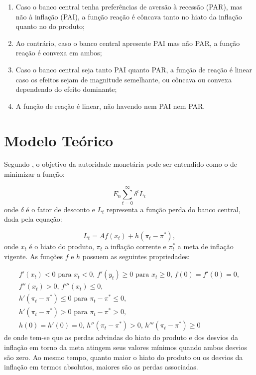 \documentclass[
	article,			%
	11pt,				%
	oneside,			%
	a4paper,			%
	english,			%
	brazil,				%
	]{abntex2}
\begin{document}
	\begin{enumerate}
		\item Caso o banco central tenha preferências de aversão à recessão (PAR), mas não à inflação (PAI), a função reação é côncava tanto no hiato da inflação quanto no do produto;
		\item Ao contrário, caso o banco central apresente PAI mas não PAR, a função reação é convexa em ambos;
		\item Caso o banco central seja tanto PAI quanto PAR, a função de reação é linear caso os efeitos sejam de magnitude semelhante, ou côncava ou convexa dependendo do efeito dominante;
		\item A função de reação é linear, não havendo nem PAI nem PAR.
	\end{enumerate}
	
	\section{Modelo Teórico}
	
	Segundo , o objetivo da autoridade monetária pode ser entendido como o de minimizar a função:
	
	\begin{equation}  \label{funcao_perda}
		E_0\sum_{t=0}^{\infty}\delta^t L_t
	\end{equation}
	onde $\delta$ é o fator de desconto e $L_{t}$ representa a função perda do banco central, dada pela equação:
	
	\begin{equation}
		L_t = Af(x_t) + h(\pi_t - \pi^*),
	\end{equation}
	onde $x_t$ é o hiato do produto, $\pi_t$ a inflação corrente e $\pi_t^*$ a meta de inflação vigente. As funções $f$ e $h$ possuem as seguintes propriedades:
	
	\begin{eqnarray}
		f'(x_t) < 0 \mbox{ para } x_t < 0 \mbox{, } f'(y_t) \geq 0 \mbox{ para } x_t \geq 0 \mbox{, } f(0) = f'(0) = 0,\nonumber \\
		f''(x_t)>0 \mbox{, } f'''(x_t) \leq 0,\nonumber \\
		h'(\pi_t-\pi^*) \leq 0 \mbox{ para } \pi_t - \pi^* \leq 0, \nonumber \\
		h'(\pi_t-\pi^*) > 0 \mbox{ para } \pi_t - \pi^* > 0, \nonumber \\
		h(0)=h'(0)=0 \mbox{, } h''(\pi_t-\pi^*)>0 \mbox{, } h'''(\pi_t-\pi^*) \geq 0
	\end{eqnarray}
	de onde tem-se que as perdas advindas do hiato do produto e dos desvios da inflação em torno da meta atingem seus valores mínimos quando ambos desvios são zero. Ao mesmo tempo, quanto maior o hiato do produto ou os desvios da inflação em termos absolutos, maiores são as perdas associadas. 
	
\end{document}
